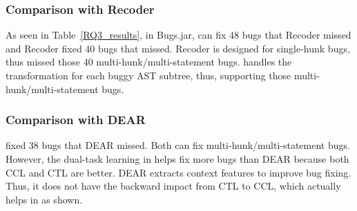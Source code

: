 
\subsubsection{\bf Comparison with Recoder}

As seen in Table~\ref{RQ3_results}, in Bugs.jar, {\tool} can fix 48
bugs that Recoder missed and Recoder fixed 40 bugs that {\tool}
missed. Recoder is designed for single-hunk bugs, thus missed those 40
multi-hunk/multi-statement bugs. {\tool} handles the transformation
for each buggy AST subtree, thus, supporting those
multi-hunk/multi-statement bugs.

\subsubsection{\bf Comparison with DEAR}
{\tool} fixed 38 bugs that DEAR missed. Both can fix
multi-hunk/multi-statement bugs. However, the dual-task learning in
{\tool} helps fix more bugs than DEAR because both CCL and CTL are
better. DEAR extracts context features to improve bug fixing. Thus, it
does not have the backward impact from CTL to CCL, which actually
helps in {\tool} as shown.

